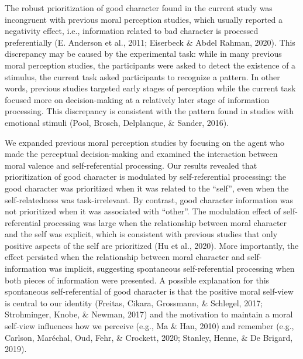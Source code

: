\documentclass[
  man]{apa6}
\begin{document}
The robust prioritization of good character found in the current study was incongruent with previous moral perception studies, which usually reported a negativity effect, i.e., information related to bad character is processed preferentially (E. Anderson et al., 2011; Eiserbeck \& Abdel Rahman, 2020). This discrepancy may be caused by the experimental task: while in many previous moral perception studies, the participants were asked to detect the existence of a stimulus, the current task asked participants to recognize a pattern. In other words, previous studies targeted early stages of perception while the current task focused more on decision-making at a relatively later stage of information processing. This discrepancy is consistent with the pattern found in studies with emotional stimuli (Pool, Brosch, Delplanque, \& Sander, 2016).

We expanded previous moral perception studies by focusing on the agent who made the perceptual decision-making and examined the interaction between moral valence and self-referential processing. Our results revealed that prioritization of good character is modulated by self-referential processing: the good character was prioritized when it was related to the ``self'', even when the self-relatedness was task-irrelevant. By contrast, good character information was not prioritized when it was associated with ``other''. The modulation effect of self-referential processing was large when the relationship between moral character and the self was explicit, which is consistent with previous studies that only positive aspects of the self are prioritized (Hu et al., 2020). More importantly, the effect persisted when the relationship between moral character and self-information was implicit, suggesting spontaneous self-referential processing when both pieces of information were presented. A possible explanation for this spontaneous self-referential of good character is that the positive moral self-view is central to our identity (Freitas, Cikara, Grossmann, \& Schlegel, 2017; Strohminger, Knobe, \& Newman, 2017) and the motivation to maintain a moral self-view influences how we perceive (e.g., Ma \& Han, 2010) and remember (e.g., Carlson, Maréchal, Oud, Fehr, \& Crockett, 2020; Stanley, Henne, \& De Brigard, 2019).
\end{document}

